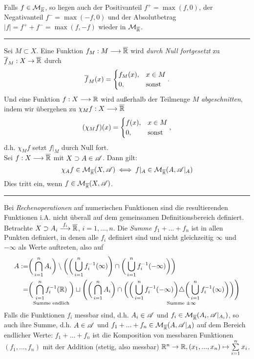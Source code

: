 \begin{korollar}
Falls $f \in \MM_{\ol\R}$, so liegen auch der Positivanteil $f^+=\max(f,0)$, der Negativanteil  $f^-=\max(-f,0)$ und der Absolutbetrag $|f|=f^++f^-=\max (f,-f)$ wieder in $\MM_{\ol\R}$.
\end{korollar}
\rule{\textwidth}{0.4pt}
Sei $M\subset X$. Eine Funktion $f_M:M\longrightarrow\ol\R$ wird \emph{durch Null fortgesetzt} zu $\ol{f}_M:X\to\ol\R$ durch
$$
\ol{f}_M(x)=\begin{cases}
f_M(x), &x\in M\\
0, &\te{sonst}
\end{cases}.
$$
Und eine Funktion $f:X\longrightarrow \R$ wird außerhalb der Teilmenge $M$ \emph{abgeschnitten}, indem wir übergehen zu $\chi_M f:X \longrightarrow\ol{\R}$
$$
(\chi_M f)(x)=\begin{cases}
f(x), & x\in M\\
0, &\te{sonst}
\end{cases},
$$
d.h. $\chi_M f$ setzt $f|_M$ durch Null fort.\vspace{0.2pc}\\
Sei $f:X\longrightarrow \ol\R$ mit $X\supset A\in \AA$. Dann gilt:
$$
\chi_Af \in \MM_{\ol\R}(X,\AA) \iff f|_A \in \MM_{\ol\R}(A,\AA|_A)
$$
Dies tritt ein, wenn $f\in \MM_{\ol\R}(X,\AA)$.\\
\rule{\textwidth}{0.4pt}
Bei \emph{Rechenoperationen} auf numerischen Funktionen sind die resultierenden Funktionen i.A. nicht überall auf dem gemeinsamen Definitionsbereich definiert. Betrachte $X\supset A_i \overset{f_i}\longrightarrow \ol\R$, $i=1,...,n$. Die \emph{Summe} $f_1+...+f_n$ ist in allen Punkten definiert, in denen alle $f_i$ definiert sind und nicht gleichzeitig $\infty$ und $-\infty$ als Werte auftreten, also auf
\begin{equation*}
\begin{split}
A:= &\bigg( \bigcap_{i=1}^n A_i\bigg) \setminus \bigg( \bigg( \bigcup_{i=1}^n f^{-1}_i(\infty)\Bigg) \cap \bigg( \bigcup_{i=1}^n f_i^{-1}(-\infty) \bigg)\bigg)\\
= &\bigg(\underset{\te{Summe endlich}}{\bigcap_{i=1}^n f^{-1}_i(\R)}\bigg) \sqcup \Bigg( \bigg( \bigcap_{i=1}^n A_i \bigg) \cap \bigg( \underset{\te{Summe }\pm \infty}{\bigg( \bigcup_{i=1}^n f_i^{-1}(-\infty)\bigg) \triangle \bigg(\bigcup_{i=1}^n f^{-1}_i(\infty)\bigg)\bigg)}\Bigg)
\end{split}
\end{equation*}
Falls die Funktionen $f_i$ messbar sind, d.h. $A_i \in \AA$ und $f_i \in \MM_{\ol\R}(A_i,\AA|_{A_i})$, so auch ihre Summe, d.h. $A\in \AA$ und $f_1+...+f_n \in \MM_{\ol\R}(A,\AA|_A)$ auf dem Bereich endlicher Werte: $f_1+...+f_n$ ist die Komposition von messbaren Funktionen $(f_1,...,f_n)$ mit der Addition (stetig, also messbar) $\R^n \to \R, (x_1,...,x_n)\mapsto \sum\limits_{i=1}^n x_i$.

